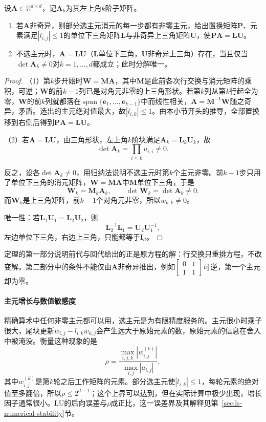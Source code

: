 \begin{theorem}[LU分解的存在与唯一]
\label{thm:ls-lu-existence}
设$\bm A\in\mathbb R^{d\times d}$，记$\bm A_k$为其左上角$k$阶子矩阵。
\begin{enumerate}
 \item 若$\bm A$非奇异，则部分选主元消元的每一步都有非零主元，给出置换矩阵$\bm P$、元素满足$|l_{i,j}|\leq1$的单位下三角矩阵$\bm L$与非奇异上三角矩阵$\bm U$，使$\bm P\bm A=\bm L\bm U$。
 \item 不选主元时，$\bm A=\bm L\bm U$（$\bm L$单位下三角，$\bm U$非奇异上三角）存在，当且仅当$\det\bm A_k\neq0$对$k=1,\ldots,d$都成立；此时分解唯一。
\end{enumerate}
\end{theorem}
\begin{proof}
（1）第$k$步开始时$\bm W=\bm M\bm A$，其中$\bm M$是此前各次行交换与消元矩阵的乘积，可逆；$\bm W$的前$k-1$列已是对角元非零的上三角形状。若第$k$列从第$k$行起全为零，$\bm W$的前$k$列就都落在$\operatorname{span}\{\bm e_1,\ldots,\bm e_{k-1}\}$中而线性相关，$\bm A=\bm M^{-1}\bm W$随之奇异，矛盾。选出的主元绝对值最大，故$|l_{i,k}|\leq1$。由本小节开头的推导，全部置换移到右侧后得到$\bm P\bm A=\bm L\bm U$。

（2）若$\bm A=\bm L\bm U$，由三角形状，左上角$k$阶块满足$\bm A_k=\bm L_k\bm U_k$，故
\[
 \det\bm A_k=\prod_{i\leq k}u_{i,i}\neq0 .
\]

反之，设各$\det\bm A_k\neq0$，用归纳法说明不选主元时第$k$个主元非零。前$k-1$步只用了单位下三角的消元矩阵，$\bm W=\bm M\bm A$中$\bm M$单位下三角，于是
\[
 \bm W_k=\bm M_k\bm A_k,\qquad \det\bm W_k=\det\bm A_k\neq0 .
\]
而$\bm W_k$是上三角矩阵，前$k-1$个对角元非零，所以$w_{k,k}\neq0$。

唯一性：若$\bm L_1\bm U_1=\bm L_2\bm U_2$，则
\[
 \bm L_2^{-1}\bm L_1=\bm U_2\bm U_1^{-1},
\]
左边单位下三角，右边上三角，只能都等于$\bm I_d$。
\end{proof}

定理的第一部分说明前代与回代给出的正是原方程的解：行交换只重排方程，不改变解。第二部分中的条件不能仅由$\bm A$非奇异推出，例如$\left[\begin{smallmatrix}0&1\\1&1\end{smallmatrix}\right]$可逆，第一个主元却为零。

\paragraph{主元增长与数值敏感度}
精确算术中任何非零主元都可以用，选主元是为有限精度服务的。主元很小时乘子很大，尾块更新$w_{i,j}-l_{i,k}w_{k,j}$会产生远大于原始元素的数，原始元素的信息在舍入中被淹没。衡量这种现象的是
\begin{equation}
 \rho=\frac{\max_{i,j,k}|w^{(k)}_{i,j}|}{\max_{i,j}|a_{i,j}|},
 \label{eq:ls-lu-growth-factor}
\end{equation}
其中$w^{(k)}_{i,j}$是第$k$轮之后工作矩阵的元素。部分选主元使$|l_{i,k}|\leq1$，每轮元素的绝对值至多翻倍，所以$\rho\leq2^{d-1}$；这个上界可以达到，但在实际计算中极少出现，增长因子通常很小。LU的后向误差与$\rho$成正比，这一误差界及其解释见第~\ref{sec:ls-numerical-stability}节。

